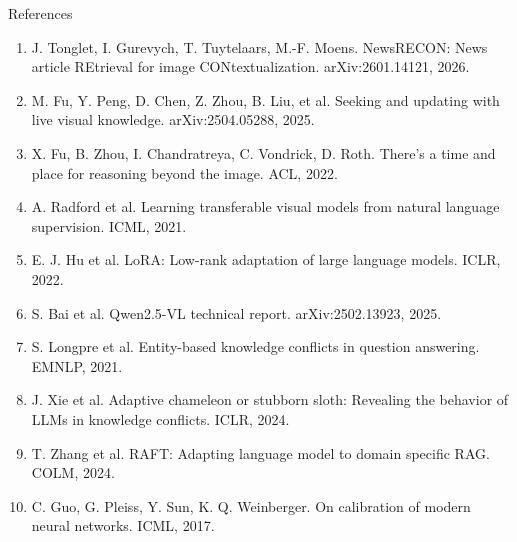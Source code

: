 \documentclass[aspectratio=169,10pt]{beamer}
\begin{document}
\begin{frame}{References}
\scriptsize
\begin{enumerate}
\item J. Tonglet, I. Gurevych, T. Tuytelaars, M.-F. Moens. NewsRECON: News article REtrieval for image CONtextualization. arXiv:2601.14121, 2026.
\item M. Fu, Y. Peng, D. Chen, Z. Zhou, B. Liu, et al. Seeking and updating with live visual knowledge. arXiv:2504.05288, 2025.
\item X. Fu, B. Zhou, I. Chandratreya, C. Vondrick, D. Roth. There's a time and place for reasoning beyond the image. ACL, 2022.
\item A. Radford et al. Learning transferable visual models from natural language supervision. ICML, 2021.
\item E. J. Hu et al. LoRA: Low-rank adaptation of large language models. ICLR, 2022.
\item S. Bai et al. Qwen2.5-VL technical report. arXiv:2502.13923, 2025.
\item S. Longpre et al. Entity-based knowledge conflicts in question answering. EMNLP, 2021.
\item J. Xie et al. Adaptive chameleon or stubborn sloth: Revealing the behavior of LLMs in knowledge conflicts. ICLR, 2024.
\item T. Zhang et al. RAFT: Adapting language model to domain specific RAG. COLM, 2024.
\item C. Guo, G. Pleiss, Y. Sun, K. Q. Weinberger. On calibration of modern neural networks. ICML, 2017.
\end{enumerate}
\end{frame}
\end{document}
